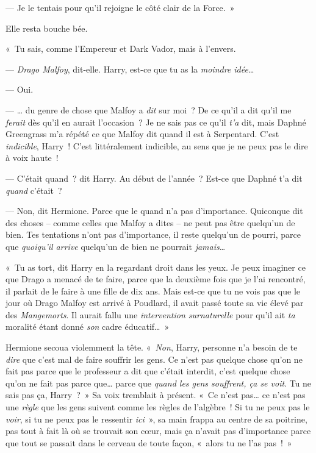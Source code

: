 --- Je le tentais pour qu'il rejoigne le côté clair de la Force.~»

Elle resta bouche bée.

«~Tu sais, comme l'Empereur et Dark Vador, mais à l'envers.

--- \emph{Drago Malfoy}, dit-elle.
Harry, est-ce que tu as la \emph{moindre idée}…

--- Oui.

--- … du genre de chose que Malfoy a \emph{dit} sur moi~?
De ce qu'il a dit qu'il me \emph{ferait} dès qu'il en aurait l'occasion~?
Je ne sais pas ce qu'il \emph{t'a} dit, mais Daphné Greengrass m'a répété ce que Malfoy dit quand il est à Serpentard.
C'est \emph{indicible}, Harry~!
C'est littéralement indicible, au sens que je ne peux pas le dire à voix haute~!

--- C'était quand~? dit Harry.
Au début de l'année~?
Est-ce que Daphné t'a dit \emph{quand} c'était~?

--- Non, dit Hermione.
Parce que le quand n'a pas d'importance.
Quiconque dit des choses -- comme celles que Malfoy a dites -- ne peut pas être quelqu'un de bien.
Tes tentations n'ont pas d'importance, il reste quelqu'un de pourri, parce que \emph{quoiqu'il arrive} quelqu'un de bien ne pourrait \emph{jamais}…

«~Tu as tort, dit Harry en la regardant droit dans les yeux.
Je peux imaginer ce que Drago a menacé de te faire, parce que la deuxième fois que je l'ai rencontré, il parlait de le faire à une fille de dix ans.
Mais est-ce que tu ne vois pas que le jour où Drago Malfoy est arrivé à Poudlard, il avait passé toute sa vie élevé par des \emph{Mangemorts}.
Il aurait fallu une \emph{intervention surnaturelle} pour qu'il ait \emph{ta} moralité étant donné \emph{son} cadre éducatif…~»

Hermione secoua violemment la tête.
«~\emph{Non}, Harry, personne n'a besoin de te \emph{dire} que c'est mal de faire souffrir les gens.
Ce n'est pas quelque chose qu'on ne fait pas parce que le professeur a dit que c'était interdit, c'est quelque chose qu'on ne fait pas parce que… parce que \emph{quand les gens souffrent, ça se voit}.
Tu ne sais pas ça, Harry~?~»
Sa voix tremblait à présent.
«~Ce n'est pas… ce n'est pas une \emph{règle} que les gens suivent comme les règles de l'algèbre~!
Si tu ne peux pas le \emph{voir}, si tu ne peux pas le ressentir \emph{ici}~», sa main frappa au centre de sa poitrine, pas tout à fait là où se trouvait son cœur, mais ça n'avait pas d'importance parce que tout se passait dans le cerveau de toute façon, «~alors tu ne l'as pas~!~»

